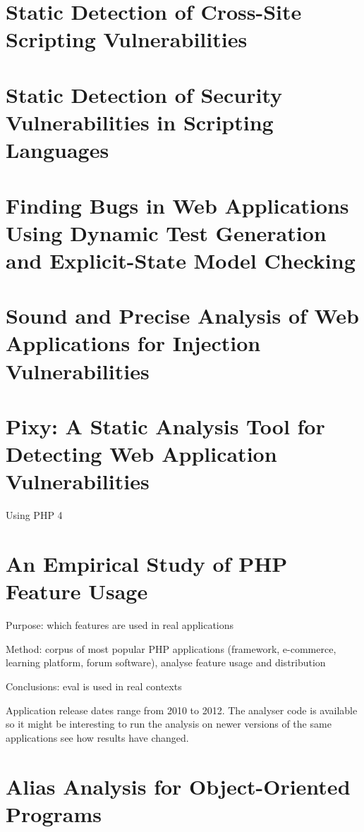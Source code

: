 \section{Static Detection of Cross-Site Scripting Vulnerabilities}

\section{Static Detection of Security Vulnerabilities in Scripting Languages}

\section{Finding Bugs in Web Applications Using Dynamic Test Generation and Explicit-State Model Checking}

\section{Sound and Precise Analysis of Web Applications for Injection Vulnerabilities}

\section{Pixy: A Static Analysis Tool for Detecting Web Application Vulnerabilities}
Using PHP 4

\section{An Empirical Study of PHP Feature Usage}
Purpose: which features are used in real applications

Method: corpus of most popular PHP applications (framework, e-commerce, learning platform, forum software), analyse feature usage and distribution

Conclusions: eval is used in real contexts

Application release dates range from 2010 to 2012. The analyser code is available so it might be interesting to run the analysis on newer versions of the same applications see how results have changed.

\section{Alias Analysis for Object-Oriented Programs}


